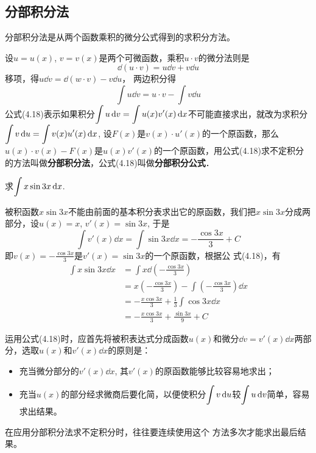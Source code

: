 \subsection{分部积分法}

分部积分法是从两个函数乘积的微分公式得到的求积分方法。

设$u=u(x)$, $v=v(x)$是两个可微函数，乘积$u\cdot v$的微分法则是$$\dd (u\cdot v) =u\dd v+v\dd u$$
移项，得$u\dd v=\dd (w\cdot v) -v\dd u$，
两边积分得
\begin{equation}
    \int u\dd v=u\cdot v-\int v\dd u
\end{equation}
公式(4.18)表示如果积分$\displaystyle\int u\,{\rm d} v=\displaystyle\int u(x)v'(x)\,{\rm d} x$不可能直接求出，就改为求积分$\displaystyle\int v\,{\rm d} u=\displaystyle\int v(x)u'(x)\,{\rm d} x$, 设$F(x)$是$v(x)\cdot u'(x)$的一个原函数，那么$u(x)\cdot v(x)-F(x)$是$u(x)v'(x)$的一个原函数，用公式(4.18)求不定积分的方法叫做\textbf{分部积分法}，公式(4.18)叫做\textbf{分部积分公式}．

\begin{example}
    求$\displaystyle\int x\sin 3x\,{\rm d} x$.
\end{example}

\begin{solution}
被积函数$x\sin3x$不能由前面的基本积分表求出它的原函数，我们把$x\sin3x$分成两部分，设$u(x)=x$, $v'(x)=\sin3x$, 于是
\[\int v' (x) \dd x= \int \sin3x\dd x=-\frac{\cos3x}{3}+C\]
即$v(x)=-\frac{\cos3x}{3}$是$v'(x)=\sin3x$的一个原函数，根据公
式(4.18)，有
\[\begin{split}
    \int x\sin 3x\dd x&=\int x\dd\left(-\frac{\cos 3x}{3}\right)\\
    &=x\left(-\frac{\cos 3x}{3}\right)-\int\left(-\frac{\cos3x}{3}\right)\dd x \\
&=-\frac{x\cos 3x}{3}+\frac{1}{3}\int \cos 3x\dd x\\
&=-\frac{x\cos 3x}{3}+\frac{\sin 3x}{9}+C
\end{split}\]
\end{solution}

运用公式(4.18)时，应首先将被积表达式分成函数$u(x)$和微分$\dd v=v'(x)\dd x$两部分，选取$u(x)$和$v'(x)\dd x$的原则是：
\begin{itemize}
    \item 充当微分部分的$v'(x)\dd x$, 其$v'(x)$的原函数能够比较容易地求出；
\item 
充当$u(x)$的部分经求微商后要化简，以便使积分$\displaystyle\int v\,{\rm d} u$较$\displaystyle\int u\,{\rm d} v$简单，容易求出结果。
\end{itemize}

在应用分部积分法求不定积分时，往往要连续使用这个
方法多次才能求出最后结果。

